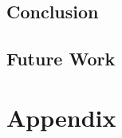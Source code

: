 \documentclass[12pt]{asu}
\begin{document}
		\section{Conclusion}
		 \label{concl}
		\section{Future Work}
		 \label{futwork}

	\newpage

        
	

	\appendix
	\fontsize{11pt}{26pt}\selectfont

	\chapter[Appendix]{\centering Appendix}
		 \label{otherstuff}


	\newpage
		
\end{document}
